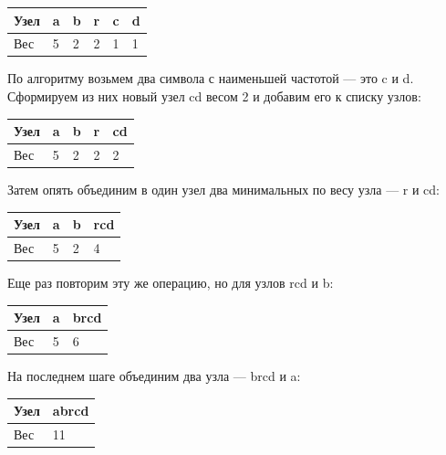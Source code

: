 \begin{table}[H]
\begin{tabular}{|l|l|l|l|l|l|}
\hline
Узел & a & b & r & c & d \\ \hline
Вес  & 5 & 2 & 2 & 1 & 1 \\ \hline
\end{tabular}
\end{table}

По алгоритму возьмем два символа с наименьшей частотой — это c и d. Сформируем из них новый узел cd весом 2 и добавим его к списку узлов:

\begin{table}[H]
\begin{tabular}{|l|l|l|l|l|}
\hline
Узел & a & b & r & cd \\ \hline
Вес  & 5 & 2 & 2 & 2  \\ \hline
\end{tabular}
\end{table}

Затем опять объединим в один узел два минимальных по весу узла — r и cd:

\begin{table}[H]
\begin{tabular}{|l|l|l|l|}
\hline
Узел & a & b & rcd \\ \hline
Вес  & 5 & 2 & 4   \\ \hline
\end{tabular}
\end{table}

Еще раз повторим эту же операцию, но для узлов rcd и b:

\begin{table}[H]
\begin{tabular}{|l|l|l|}
\hline
Узел & a & brcd \\ \hline
Вес  & 5 & 6    \\ \hline
\end{tabular}
\end{table}

На последнем шаге объединим два узла — brcd и a:

\begin{table}[H]
\begin{tabular}{|l|l|}
\hline
Узел & abrcd \\ \hline
Вес  & 11    \\ \hline
\end{tabular}
\end{table}

